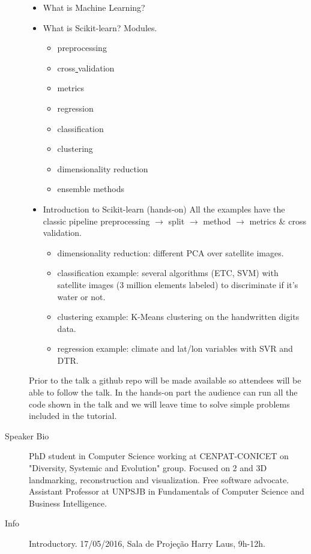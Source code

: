 \begin{description}
    \begin{itemize}
       \item What is Machine Learning?
       \item What is Scikit-learn? Modules.
       \begin{itemize}
          \item preprocessing
          \item cross\underline{{} }validation
          \item metrics
          \item regression
          \item classification
          \item clustering
          \item dimensionality reduction
          \item ensemble methods
       \end{itemize}
       \item Introduction to Scikit-learn (hands-on) All the examples have the classic pipeline preprocessing $\to$ split $\to$ method $\to$ metrics \& cross validation.
       \begin{itemize}
          \item dimensionality reduction: different PCA over satellite images.
          \item classification example: several algorithms (ETC, SVM) with satellite images (3 million elements labeled) to discriminate if it's water or not.
          \item clustering example: K-Means clustering on the handwritten digits data.
          \item regression example: climate and lat/lon variables with SVR and DTR.
       \end{itemize}
    \end{itemize}

Prior to the talk a github repo will be made available so attendees will be able to follow the talk. In the hands-on part the audience can run all the code shown in the talk and we will leave time to solve simple problems included in the tutorial.
    \item[Speaker Bio] PhD student in Computer Science working at CENPAT-CONICET on "Diversity, Systemic and Evolution" group. Focused on 2 and 3D landmarking, reconstruction and visualization. Free software advocate. Assistant Professor at UNPSJB in Fundamentals of Computer Science and Business Intelligence.
    \item[Info] Introductory. 17/05/2016, Sala de Projeção Harry Laus, 9h-12h.
\end{description} 

